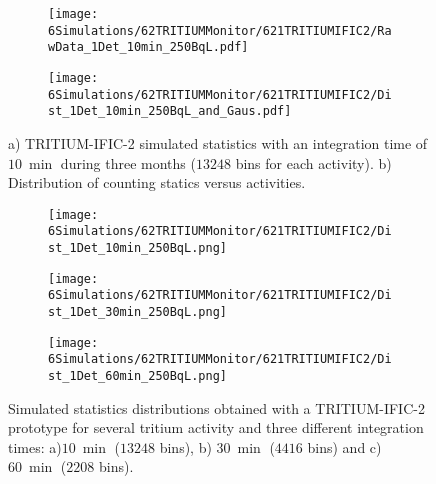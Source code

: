 \begin{figure}
\centering
    \begin{subfigure}[b]{0.7\textwidth}
    \centering
    \texttt{[image: 6Simulations/62TRITIUMMonitor/621TRITIUMIFIC2/RawData\_1Det\_10min\_250BqL.pdf]}  
    \caption{\label{subfig:RawData1Det10Min250BqL}}
    \end{subfigure}
    \hfill
    \begin{subfigure}[b]{0.7\textwidth}
    \centering
    \texttt{[image: 6Simulations/62TRITIUMMonitor/621TRITIUMIFIC2/Dist\_1Det\_10min\_250BqL\_and\_Gaus.pdf]}  
    \caption{\label{subfig:Dist1Det10Min250BqL}}
    \end{subfigure}
 \caption{a) TRITIUM-IFIC-2 simulated statistics with an integration time of $10~\min$ during three months ($13248$ bins for each activity). b) Distribution of counting statics versus activities.}
 \label{fig:1Det10Min250BqL}
\end{figure}

\begin{figure}
\centering
    \begin{subfigure}[b]{0.6\textwidth}
    \centering
    \texttt{[image: 6Simulations/62TRITIUMMonitor/621TRITIUMIFIC2/Dist\_1Det\_10min\_250BqL.png]}  
    \caption{\label{subfig:1Det10min250BqLST}}
    \end{subfigure}
    \hfill
    \begin{subfigure}[b]{0.6\textwidth}
    \centering
    \texttt{[image: 6Simulations/62TRITIUMMonitor/621TRITIUMIFIC2/Dist\_1Det\_30min\_250BqL.png]}  
    \caption{\label{subfig:1Det30min250BqLST}}
    \end{subfigure}
    \hfill
    \begin{subfigure}[b]{0.6\textwidth}
    \centering
    \texttt{[image: 6Simulations/62TRITIUMMonitor/621TRITIUMIFIC2/Dist\_1Det\_60min\_250BqL.png]}  
    \caption{\label{subfig:1Det60min250BqLST}}
    \end{subfigure}
 \caption{Simulated statistics distributions obtained with a TRITIUM-IFIC-2 prototype for several tritium activity and three different integration times: a)$10~\min$ ($13248$ bins), b) $30~\min$ ($4416$ bins) and c) $60~\min$ ($2208$ bins).}
 \label{fig:1Det250BqLseveralTimes}
\end{figure} 

